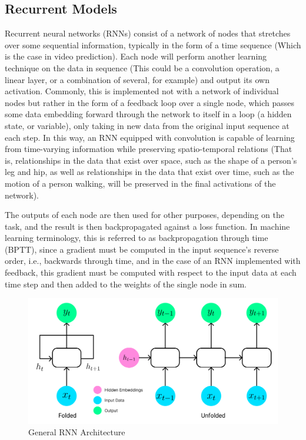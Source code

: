 \documentclass{scrartcl}
\begin{document}
\subsection{Recurrent Models}
\label{subsec:recurrent}

Recurrent neural networks (RNNs) consist of a network of nodes that stretches
over some sequential information, typically in the form of a time sequence
(Which is the case in video prediction). Each node will perform another
learning technique on the data in sequence (This could be a convolution
operation, a linear layer, or a combination of several, for example) and output
its own activation. Commonly, this is implemented not with a network of
individual nodes but rather in the form of a feedback loop over a single node,
which passes some data embedding forward through the network to itself in a
loop (a hidden state, or variable), only taking in new data from the original
input sequence at each step. In this way, an RNN equipped with convolution is
capable of learning from time-varying information while preserving
spatio-temporal relations (That is, relationships in the data that exist over
space, such as the shape of a person's leg and hip, as well as relationships in
the data that exist over time, such as the motion of a person walking, will be
preserved in the final activations of the network).

The outputs of each node are then used for other purposes, depending on the
task, and the result is then backpropagated against a loss function. In machine
learning terminology, this is referred to as backpropagation through time (BPTT),
since a gradient must be computed in the input sequence's reverse order, i.e.,
backwards through time, and in the case of an RNN implemented with feedback,
this gradient must be computed with respect to the input data at each time step
and then added to the weights of the single node in sum.

\begin{figure}[H]
	\begin{center}
		\includegraphics[width=1\textwidth]{figures/rnn_arch.png}
	\end{center}
	\caption{General RNN Architecture}
	\label{fig:rnn_arch}
\end{figure}
\end{document}
